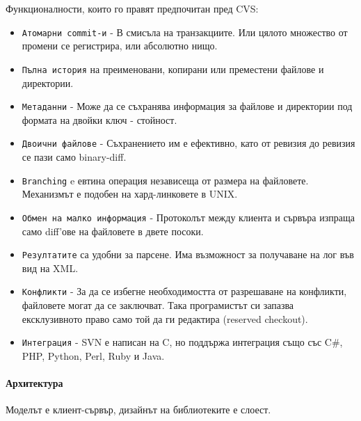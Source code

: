 \documentclass[a4paper]{article}
\begin{document}
    Функционалности, които го правят предпочитан пред CVS:
    \begin{itemize}
      \item \texttt{Атомарни commit-и} - В смисъла на транзакциите. Или цялото множество от промени се регистрира, или абсолютно нищо.
      \item \texttt{Пълна история} на преименовани, копирани или преместени файлове и директории.
      \item \texttt{Метаданни} - Може да се съхранява информация за файлове и директории под формата на двойки ключ - стойност.
      \item \texttt{Двоични файлове} - Съхранението им е ефективно, като от ревизия до ревизия се пази само binary-diff.
      \item \texttt{Branching} e евтина операция независеща от размера на файловете. Механизмът е подобен на хард-линковете в UNIX.
      \item \texttt{Обмен на малко информация} - Протоколът между клиента и сървъра изпраща само diff'ове на файловете в двете посоки.
      \item \texttt{Резултатите} са удобни за парсене. Има възможност за получаване на лог във вид на XML.
      \item \texttt{Конфликти} - За да се избегне необходимостта от разрешаване на конфликти, файловете могат да се заключват. Така програмистът си запазва ексклузивното право само той да ги редактира (reserved checkout).
      \item \texttt{Интеграция} - SVN е написан на C, но поддържа интеграция също със C\#, PHP, Python, Perl, Ruby и Java.
    \end{itemize}

    \paragraph{Архитектура}
    Моделът е клиент-сървър, дизайнът на библиотеките е слоест.
\end{document}
